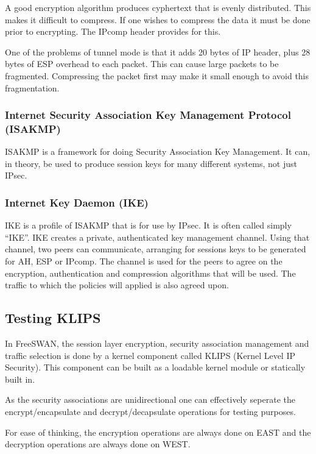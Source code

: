 A good encryption algorithm produces cyphertext that is evenly
distributed. This makes it difficult to compress. If one wishes to compress
the data it must be done prior to encrypting. The IPcomp header provides for this.

One of the problems of tunnel mode is that it adds 20 bytes of IP header,
plus 28 bytes of ESP overhead to each packet. This can cause large packets to
be fragmented. Compressing the packet first may make it small enough to avoid 
this fragmentation.

\subsubsection{Internet Security Association Key Management Protocol (ISAKMP)}

ISAKMP is a framework for doing Security Association Key Management. It can,
in theory, be used to produce session keys for many different systems, not
just IPsec.

\subsubsection{Internet Key Daemon (IKE)}

IKE is a profile of ISAKMP that is for use by IPsec. It is often called simply
``IKE''. IKE creates a private, authenticated key management channel. Using
that channel, two peers can communicate, arranging for sessions keys to be
generated for AH, ESP or IPcomp. The channel is used for the peers to agree
on the encryption, authentication and compression algorithms that will be
used. The traffic to which the policies will applied is also agreed upon.

\subsection{Testing KLIPS}

In FreeSWAN, the session layer encryption, security association management
and traffic selection is done by a kernel component called KLIPS (Kernel Level
IP Security). This component can be built as a loadable kernel module or
statically built in. 

As the security associations are unidirectional one can effectively seperate
the encrypt/encapsulate and decrypt/decapsulate operations for testing
purposes.

For ease of thinking, the encryption operations are always done on {\scshape
EAST} and the decryption operations are always done on {\scshape WEST}.

